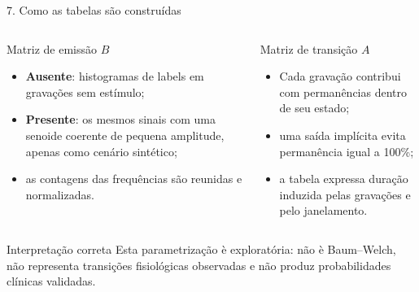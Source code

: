 \documentclass{beamer}
\begin{document}
\begin{frame}{7. Como as tabelas s\~ao constru\'idas}
\normalsize
\begin{columns}[T]
\begin{block}{Matriz de emiss\~ao $B$}
\begin{itemize}
  \item \textbf{Ausente}: histogramas de labels em grava\c{c}\~oes sem est\'imulo;
  \item \textbf{Presente}: os mesmos sinais com uma senoide coerente de pequena
  amplitude, apenas como cen\'ario sint\'etico;
  \item as contagens das frequ\^encias s\~ao reunidas e normalizadas.
\end{itemize}
\end{block}

\begin{block}{Matriz de transi\c{c}\~ao $A$}
\begin{itemize}
  \item Cada grava\c{c}\~ao contribui com perman\^encias dentro de seu estado;
  \item uma sa\'ida impl\'icita evita perman\^encia igual a 100\%;
  \item a tabela expressa dura\c{c}\~ao induzida pelas grava\c{c}\~oes e pelo
  janelamento.
\end{itemize}
\end{block}
\end{columns}

\begin{alertblock}{Interpreta\c{c}\~ao correta}
Esta parametriza\c{c}\~ao \`e explorat\'oria: n\~ao \`e Baum--Welch, n\~ao representa
transi\c{c}\~oes fisiol\'ogicas observadas e n\~ao produz probabilidades cl\'inicas
validadas.
\end{alertblock}
\end{frame}

\end{document}
